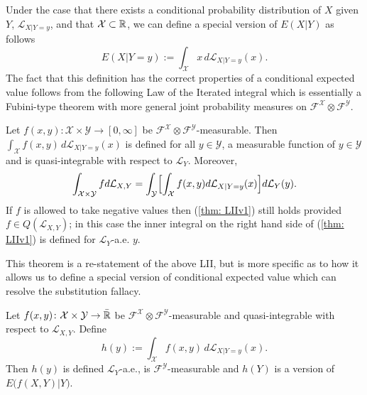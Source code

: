 Under the case that there exists a conditional probability distribution of $X$ given $Y$, $\mathcal L_{X|Y=y}$, and that $\mathcal X\subset \Bbb R$, we can define a special version of $E(X|Y)$ as follows
\[ E(X|Y=y) := \int_{\mathcal X} x \,d\mathcal L_{X|Y=y}(x). \]
The fact that this definition has the correct properties of a conditional expected value follows from the following Law of the Iterated integral which is essentially a Fubini-type theorem with more general joint probability measures on $\mathcal F^{\mathcal X}\otimes \mathcal F^{\mathcal Y}$.


\begin{theorem}
\label{thm: LIIv1}
Let $f(x,y)\colon \mathcal X\times \mathcal Y\rightarrow [0,\infty]$ be $\mathcal F^{\mathcal X}\otimes \mathcal F^{\mathcal Y}$-measurable. Then $\int_{\mathcal X} f(x,y)\,d\mathcal L_{X|Y=y}(x)$ is defined for all $y\in \mathcal Y$, a measurable function of $y\in \mathcal Y$ and is quasi-integrable with respect to $\mathcal L_Y$. Moreover,
\begin{equation}
\label{thm: LIIv1}
\int_{\mathcal X\times \mathcal Y} f d\mathcal L_{X,Y} =
\int_{\mathcal Y}\Bigl[\int_{\mathcal X} f(x,y)d\mathcal L_{X|Y=y}(x)\Bigr] d\mathcal L_Y(y).
\end{equation}
If $f$ is allowed to take negative values then (\ref{thm: LIIv1}) still holds provided $f\in Q(\mathcal L_{X,Y})$; in this case the inner integral on the right hand side of (\ref{thm: LIIv1}) is defined for $\mathcal L_Y$-a.e. $y$.
\end{theorem}


This theorem is a re-statement of the above LII, but is more specific as to how it allows us to define a special version of conditional expected value which can resolve the substitution fallacy.

\begin{theorem}
\label{thm: LII}
Let $f(x,y)\colon \mathcal X\times \mathcal Y\rightarrow \bar{\Bbb R}$ be $\mathcal F^{\mathcal X}\otimes \mathcal F^{\mathcal Y}$-measurable and quasi-integrable with respect to $\mathcal L_{X,Y}$. Define
\begin{equation}
\label{eq: subs principle}
h(y) := \int_{\mathcal X} f(x,y)\,d\mathcal L_{X|Y=y}(x).
\end{equation}
Then $h(y)$ is defined $\mathcal L_Y$-a.e., is $\mathcal F^{\mathcal Y}$-measurable and  $h(Y)$ is a version of $E\bigl(f(X,Y)|Y \bigr)$.
\end{theorem}


